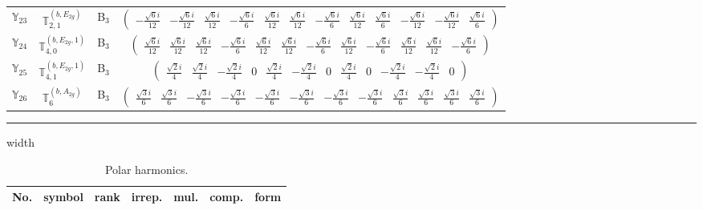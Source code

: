 \documentclass[fleqn,10pt,landscape]{article}
\begin{document}
\begin{itemize}
\begin{center}
\begin{longtable}{c|c|c|c}
$ \mathbb{Y}_{23} $ & $\mathbb{T}_{2,1}^{(b,E_{2g})}$ & B$_{3}$ & $\begin{pmatrix} - \frac{\sqrt{6} i}{12} & - \frac{\sqrt{6} i}{12} & \frac{\sqrt{6} i}{12} & - \frac{\sqrt{6} i}{6} & \frac{\sqrt{6} i}{12} & \frac{\sqrt{6} i}{12} & - \frac{\sqrt{6} i}{6} & \frac{\sqrt{6} i}{12} & \frac{\sqrt{6} i}{6} & - \frac{\sqrt{6} i}{12} & - \frac{\sqrt{6} i}{12} & \frac{\sqrt{6} i}{6} \end{pmatrix}$ \\
$ \mathbb{Y}_{24} $ & $\mathbb{T}_{4,0}^{(b,E_{2g},1)}$ & B$_{3}$ & $\begin{pmatrix} \frac{\sqrt{6} i}{12} & \frac{\sqrt{6} i}{12} & \frac{\sqrt{6} i}{12} & - \frac{\sqrt{6} i}{6} & \frac{\sqrt{6} i}{12} & \frac{\sqrt{6} i}{12} & - \frac{\sqrt{6} i}{6} & \frac{\sqrt{6} i}{12} & - \frac{\sqrt{6} i}{6} & \frac{\sqrt{6} i}{12} & \frac{\sqrt{6} i}{12} & - \frac{\sqrt{6} i}{6} \end{pmatrix}$ \\
$ \mathbb{Y}_{25} $ & $\mathbb{T}_{4,1}^{(b,E_{2g},1)}$ & B$_{3}$ & $\begin{pmatrix} \frac{\sqrt{2} i}{4} & \frac{\sqrt{2} i}{4} & - \frac{\sqrt{2} i}{4} & 0 & \frac{\sqrt{2} i}{4} & - \frac{\sqrt{2} i}{4} & 0 & \frac{\sqrt{2} i}{4} & 0 & - \frac{\sqrt{2} i}{4} & - \frac{\sqrt{2} i}{4} & 0 \end{pmatrix}$ \\
$ \mathbb{Y}_{26} $ & $\mathbb{T}_{6}^{(b,A_{2g})}$ & B$_{3}$ & $\begin{pmatrix} \frac{\sqrt{3} i}{6} & \frac{\sqrt{3} i}{6} & - \frac{\sqrt{3} i}{6} & - \frac{\sqrt{3} i}{6} & - \frac{\sqrt{3} i}{6} & - \frac{\sqrt{3} i}{6} & - \frac{\sqrt{3} i}{6} & - \frac{\sqrt{3} i}{6} & \frac{\sqrt{3} i}{6} & \frac{\sqrt{3} i}{6} & \frac{\sqrt{3} i}{6} & \frac{\sqrt{3} i}{6} \end{pmatrix}$ \\
\end{longtable}
\end{center}

 \hfil \hrule height 1mm width \textwidth \hfil

\begin{center}
\renewcommand{\arraystretch}{1.3}
\begin{longtable}{ccccccc}
\caption{Polar harmonics.}
 \\
 \hline \hline
No. & symbol & rank & irrep. & mul. & comp. & form \\ \hline \endfirsthead


\end{longtable}
\end{center}
\end{itemize}
\end{document}
